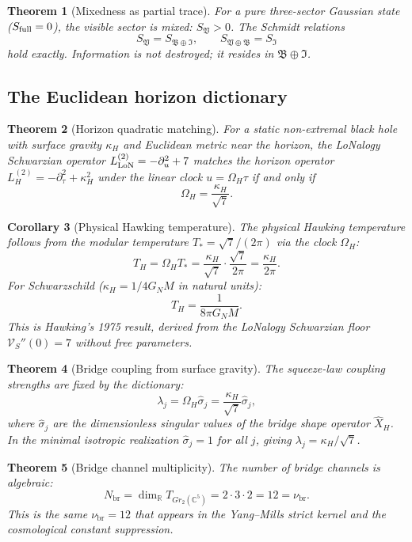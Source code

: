 \documentclass[12pt]{article}
\theoremstyle{plain}
\newtheorem{theorem}{Theorem}[section]
\newtheorem{corollary}[theorem]{Corollary}
\theoremstyle{definition}
\numberwithin{equation}{section}
\newcommand{\R}{\mathbb{R}}
\newcommand{\C}{\mathbb{C}}
\newcommand{\br}{\mathrm{br}}
\newcommand{\fI}{\mathfrak{I}}
\newcommand{\fV}{\mathfrak{V}}
\newcommand{\fB}{\mathfrak{B}}
\begin{document}
\begin{theorem}[Mixedness as partial trace]\label{thm:BHmixed}
For a pure three-sector Gaussian state ($S_{\rm full}=0$), the visible sector is mixed: $S_\fV>0$.  The Schmidt relations
\[
S_\fV = S_{\fB\oplus\fI}, \qquad S_{\fV\oplus\fB} = S_\fI
\]
hold exactly.  Information is not destroyed; it resides in $\fB\oplus\fI$.
\end{theorem}

\subsection{The Euclidean horizon dictionary}

\begin{theorem}[Horizon quadratic matching]\label{thm:BHdict}
For a static non-extremal black hole with surface gravity $\kappa_H$ and Euclidean metric near the horizon,
the LoNalogy Schwarzian operator $L_{\rm LoN}^{(2)} = -\partial_u^2 + 7$ matches the horizon operator $L_H^{(2)} = -\partial_\tau^2 + \kappa_H^2$ under the linear clock $u = \Omega_H\tau$ if and only if
\[
\boxed{\Omega_H = \frac{\kappa_H}{\sqrt{7}}.}
\]
\end{theorem}

\begin{corollary}[Physical Hawking temperature]\label{cor:TH}
The physical Hawking temperature follows from the modular temperature $T_* = \sqrt{7}/(2\pi)$ via the clock $\Omega_H$:
\[
\boxed{T_H = \Omega_H T_* = \frac{\kappa_H}{\sqrt{7}}\cdot\frac{\sqrt{7}}{2\pi} = \frac{\kappa_H}{2\pi}.}
\]
For Schwarzschild ($\kappa_H = 1/4G_N M$ in natural units):
\[
T_H = \frac{1}{8\pi G_N M}.
\]
This is Hawking's 1975 result, derived from the LoNalogy Schwarzian floor $\mathcal{V}_S''(0)=7$ without free parameters.
\end{corollary}

\begin{theorem}[Bridge coupling from surface gravity]\label{thm:BHlambda}
The squeeze-law coupling strengths are fixed by the dictionary:
\[
\boxed{\lambda_j = \Omega_H\hat{\sigma}_j = \frac{\kappa_H}{\sqrt{7}}\hat{\sigma}_j,}
\]
where $\hat{\sigma}_j$ are the dimensionless singular values of the bridge shape operator $\widehat{X}_H$.  In the minimal isotropic realization $\hat{\sigma}_j = 1$ for all $j$, giving $\lambda_j = \kappa_H/\sqrt{7}$.
\end{theorem}

\begin{theorem}[Bridge channel multiplicity]\label{thm:BHNbr}
The number of bridge channels is algebraic:
\[
N_\br = \dim_\R T_{Gr_2(\C^5)} = 2\cdot 3\cdot 2 = 12 = \nu_\br.
\]
This is the same $\nu_\br = 12$ that appears in the Yang--Mills strict kernel and the cosmological constant suppression.
\end{theorem}
\end{document}
